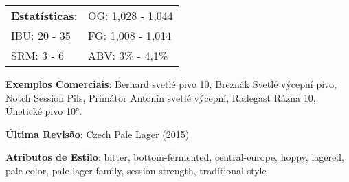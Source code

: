 \begin{tabular}{@{}p{35mm}p{35mm}@{}}
  \textbf{Estatísticas}: & OG: 1,028 - 1,044 \\
  IBU: 20 - 35  & FG: 1,008 - 1,014  \\
  SRM: 3 - 6   & ABV: 3\% - 4,1\%
\end{tabular}

\textbf{Exemplos Comerciais}: Bernard svetlé pivo 10, Breznák Svetlé výcepní pivo, Notch Session Pils, Primátor Antonín svetlé výcepní, Radegast Rázna 10, Únetické pivo 10°.

\textbf{Última Revisão}: Czech Pale Lager (2015)

\textbf{Atributos de Estilo}: bitter, bottom-fermented, central-europe, hoppy, lagered, pale-color, pale-lager-family, session-strength, traditional-style